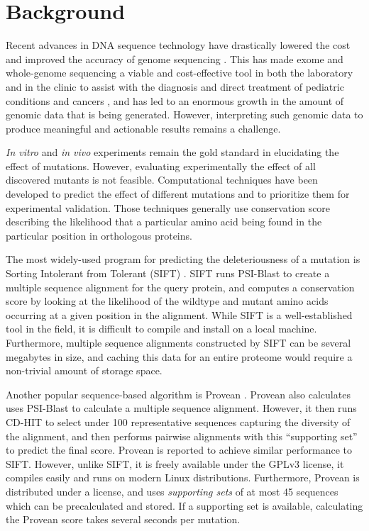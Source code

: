 

\section{Background}

Recent advances in DNA sequence technology have drastically lowered the cost and improved the accuracy of genome sequencing \cite{wetterstrand_dna_2016}. This has made exome and whole-genome sequencing a viable and cost-effective tool in both the laboratory and in the clinic to assist with the diagnosis and direct treatment of pediatric conditions \cite{chrystoja_whole_2014} and cancers \cite{nik-zainal_landscape_2016}, and has led to an enormous growth in the amount of genomic data that is being generated. However, interpreting such genomic data to produce meaningful and actionable results remains a challenge.

\textit{In vitro} and \textit{in vivo} experiments remain the gold standard in elucidating the effect of mutations. However, evaluating experimentally the effect of all discovered mutants is not feasible. Computational techniques have been developed to predict the effect of different mutations and to prioritize them for experimental validation. Those techniques generally use conservation score describing the likelihood that a particular amino acid being found in the particular position in orthologous proteins.

The most widely-used program for predicting the deleteriousness of a mutation is Sorting Intolerant from Tolerant (SIFT) \cite{ng_sift:_2003}. SIFT runs PSI-Blast to create a multiple sequence alignment for the query protein, and computes a conservation score by looking at the likelihood of the wildtype and mutant amino acids occurring at a given position in the alignment. While SIFT is a well-established tool in the field, it is difficult to compile and install on a local machine. Furthermore, multiple sequence alignments constructed by SIFT can be several megabytes in size, and caching this data for an entire proteome would require a non-trivial amount of storage space.

Another popular sequence-based algorithm is Provean \cite{choi_predicting_2012}. Provean also calculates uses PSI-Blast to calculate a multiple sequence alignment. However, it then runs CD-HIT to select under 100 representative sequences capturing the diversity of the alignment, and then performs pairwise alignments with this ``supporting set'' to predict the final score. Provean is reported to achieve similar performance to SIFT. However, unlike SIFT, it is freely available under the GPLv3 license, it compiles easily and runs on modern Linux distributions. Furthermore, Provean is distributed under a  license, and uses \textit{supporting sets} of at most 45 sequences which can be precalculated and stored. If a supporting set is available, calculating the Provean score takes several seconds per mutation.

